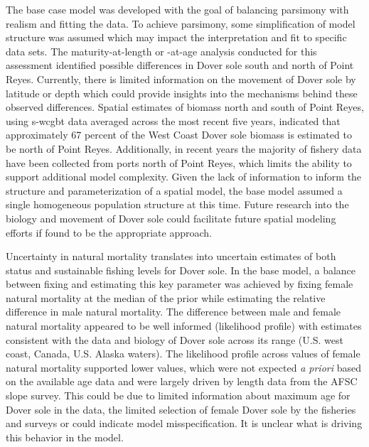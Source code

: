 \documentclass[11pt,
  english,
  a4paper,
]{article}
\begin{document}
\leavevmode\tagmcend\tagstructend


The base case model was developed with the goal of balancing parsimony with realism and fitting the data. To achieve parsimony, some simplification of model structure was assumed which may impact the interpretation and fit to specific data sets. The maturity-at-length or -at-age analysis conducted for this assessment identified possible differences in Dover sole south and north of Point Reyes. Currently, there is limited information on the movement of Dover sole by latitude or depth which could provide insights into the mechanisms behind these observed differences. Spatial estimates of biomass north and south of Point Reyes, using \gls{s-wcgbt} data averaged across the most recent five years, indicated that approximately 67 percent of the West Coast Dover sole biomass is estimated to be north of Point Reyes. Additionally, in recent years the majority of fishery data have been collected from ports north of Point Reyes, which limits the ability to support additional model complexity. Given the lack of information to inform the structure and parameterization of a spatial model, the base model assumed a single homogeneous population structure at this time. Future research into the biology and movement of Dover sole could facilitate future spatial modeling efforts if found to be the appropriate approach.

\leavevmode\tagmcend\tagstructend\par


Uncertainty in natural mortality translates into uncertain estimates of both status and sustainable fishing levels for Dover sole. In the base model, a balance between fixing and estimating this key parameter was achieved by fixing female natural mortality at the median of the prior while estimating the relative difference in male natural mortality. The difference between male and female natural mortality appeared to be well informed (likelihood profile) with estimates consistent with the data and biology of Dover sole across its range (U.S. west coast, Canada, U.S. Alaska waters). The likelihood profile across values of female natural mortality supported lower values, which were not expected \emph{a priori} based on the available age data and were largely driven by length data from the AFSC slope survey. This could be due to limited information about maximum age for Dover sole in the data, the limited selection of female Dover sole by the fisheries and surveys or could indicate model misspecification. It is unclear what is driving this behavior in the model.
\end{document}
